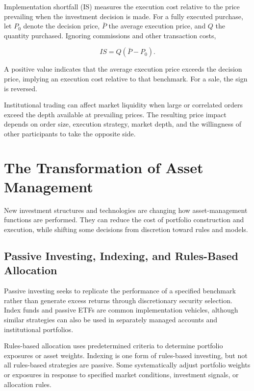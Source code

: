 Implementation shortfall (IS) measures the execution cost
relative to the price prevailing when the investment decision
is made. For a fully executed purchase, let $P_0$ denote the
decision price, $\bar{P}$ the average execution price, and
$Q$ the quantity purchased. Ignoring commissions and other
transaction costs,

\begin{equation}
IS=Q(\bar{P}-P_0).
\label{eq:ch14-implementation-shortfall}
\end{equation}

A positive value indicates that the average execution price
exceeds the decision price, implying an execution cost
relative to that benchmark. For a sale, the sign is reversed.

Institutional trading can affect market liquidity when large or correlated orders exceed the depth available at prevailing prices. The resulting price impact depends on order size, execution strategy, market depth, and the willingness of other participants to take the opposite side.

\section{The Transformation of Asset Management}

New investment structures and technologies are changing how asset-management functions are performed. They can reduce the cost of portfolio construction and execution, while shifting some decisions from discretion toward rules and models.

\subsection{Passive Investing, Indexing, and Rules-Based Allocation}

Passive investing seeks to replicate the performance of a
specified benchmark rather than generate excess returns
through discretionary security selection. Index funds and
passive ETFs are common implementation vehicles, although
similar strategies can also be used in separately managed
accounts and institutional portfolios.

Rules-based allocation uses predetermined criteria to
determine portfolio exposures or asset weights. Indexing
is one form of rules-based investing, but not all
rules-based strategies are passive. Some systematically
adjust portfolio weights or exposures in response to
specified market conditions, investment signals, or
allocation rules.

